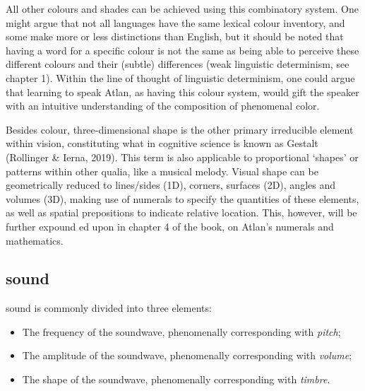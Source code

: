 
All other colours and shades can be achieved using this combinatory system. One might argue that not all languages have the same lexical colour inventory, and some make more or less distinctions than English, but it should be noted that having a word for a specific colour is not the same as being able to perceive these different colours and their (subtle) differences (weak linguistic determinism, see chapter 1). Within the line of thought of linguistic determinism, one could argue that learning to speak Atlan, as having this colour system, would gift the speaker with an intuitive understanding of the composition of phenomenal color. 

Besides colour, three-dimensional shape is the other primary irreducible element within vision, constituting what in cognitive science is known as Gestalt (Rollinger \& Ierna, 2019). This term is also applicable to proportional ‘shapes’ or patterns within other qualia, like a musical melody. Visual shape can be geometrically reduced to lines/sides (1D), corners, surfaces (2D), angles and volumes (3D), making use of numerals to specify the quantities of these elements, as well as spatial prepositions to indicate relative location. This, however, will be further expound ed upon in chapter 4 of the book, on Atlan’s numerals and mathematics.  


\subsection{sound}

\noindent sound is commonly divided into three elements:

\begin{itemize}
\item   The frequency of the soundwave, phenomenally corresponding with \textit{pitch}; 

\item   The amplitude of the soundwave, phenomenally corresponding with \textit{volume};

\item   The shape of the soundwave, phenomenally corresponding with \textit{timbre}.

\end{itemize}


